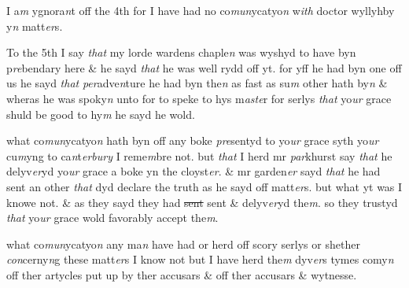 \documentclass[12pt, a4paper]{book}
\begin{document}
				\marginpar[\vspace{0.5cm}{\textcolor{Gray}{4}}]{}
			
		\ifthenelse{\isodd{\thepage}}
		{\reversemarginpar}
		{\normalmarginpar}
		I a\textit{m} ygnora\textit{n}t off the 4th for I have had no co\textit{mun}ycatyo\textit{n} w\textit{ith} doctor wyllyhby y\textit{n} matt\textit{er}s. 


				\marginpar[\vspace{0.5cm}{\textcolor{Gray}{5}}]{}
			
		\ifthenelse{\isodd{\thepage}}
		{\reversemarginpar}
		{\normalmarginpar}
		To the 5th I say \textit{that} my lorde wardens chaple\textit{n} was wyshyd to have byn p\textit{re}bendary
here \& he sayd \textit{that} he was well rydd off yt. for yff he had byn one off us he sayd
\textit{that}
               \textit{per}adve\textit{n}ture he had byn the\textit{n} as fast as su\textit{m} other hath by\textit{n} \& wheras he was spoky\textit{n} unto 
for to speke to hys m\textit{aste}r for serlys \textit{that} yo\textit{ur} grace shuld be good to hy\textit{m} he sayd he wold.


				\marginpar[\vspace{0.5cm}{\textcolor{Gray}{6}}]{}
			
		\ifthenelse{\isodd{\thepage}}
		{\reversemarginpar}
		{\normalmarginpar}
		what co\textit{mun}ycatyo\textit{n} hath byn off any boke \textit{pre}sentyd to yo\textit{ur} grace syth yo\textit{ur} cu\textit{m}yng to ca\textit{n}t\textit{erbury}
I reme\textit{m}bre not. but \textit{that} I herd mr \textit{par}khurst say \textit{that} he delyv\textit{er}yd yo\textit{ur} grace a boke yn
the cloyst\textit{er}. \& mr garden\textit{er} sayd \textit{that} he had sent an other \textit{that} dyd declare the truth as he
sayd off matt\textit{er}s. but what yt was I knowe not. \& as they sayd they had \sout{sent} sent 
\& delyv\textit{er}yd the\textit{m}. so they trustyd \textit{that} yo\textit{ur} grace wold favorably accept the\textit{m}. 


				\marginpar[\vspace{0.5cm}{\textcolor{Gray}{7}}]{}
			
		\ifthenelse{\isodd{\thepage}}
		{\reversemarginpar}
		{\normalmarginpar}
		what co\textit{mun}ycatyo\textit{n} any ma\textit{n} have had or herd off scory serlys or shether \textit{con}cerny\textit{n}g these matt\textit{er}s 
I know not but I have herd the\textit{m} dyv\textit{er}s tymes comy\textit{n} off ther artycles put up by ther 
accusars \& off ther accusars \& wytnesse.
\end{document}
